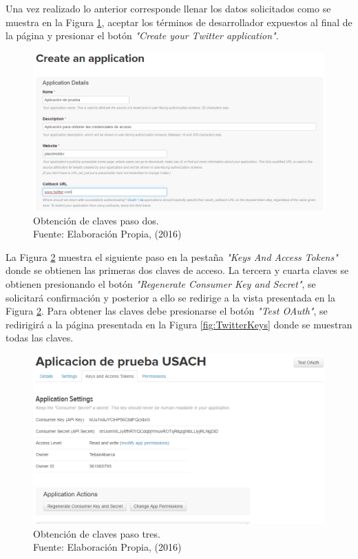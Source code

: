 Una vez realizado lo anterior corresponde llenar los datos solicitados como se muestra en la Figura \ref{fig:CreateAnApp}, aceptar los términos de desarrollador expuestos al final de la página y presionar el botón \textit{"Create your Twitter application"}. 

\begin{figure}[H]
        \centering
        \captionsetup{justification=centering}
        \includegraphics[scale=0.5]{images/CreateAnApplication.png}
        \caption[Obtención de claves paso dos.]{Obtención de claves paso dos.\\Fuente: Elaboración Propia, (2016)}
        \label{fig:CreateAnApp}
\end{figure}

La Figura \ref{fig:GetKey1} muestra el siguiente paso en la pestaña \textit{"Keys And Access Tokens"} donde se obtienen las primeras dos claves de acceso. La tercera y cuarta claves se obtienen presionando el botón \textit{"Regenerate Consumer Key and Secret"}, se solicitará confirmación y posterior a ello se redirige a la vista presentada en la Figura \ref{fig:GetKey1}. Para obtener las claves debe presionarse el botón \textit{"Test OAuth"}, se redirigirá a la página presentada en la Figura \ref{fig:TwitterKeys} donde se muestran todas las claves.

\begin{figure}[H]
        \centering
        \captionsetup{justification=centering}
        \includegraphics[scale=0.6]{images/GetToken1.png}
        \caption[Obtención de claves paso tres.]{Obtención de claves paso tres.\\Fuente: Elaboración Propia, (2016)}
        \label{fig:GetKey1}
\end{figure}

